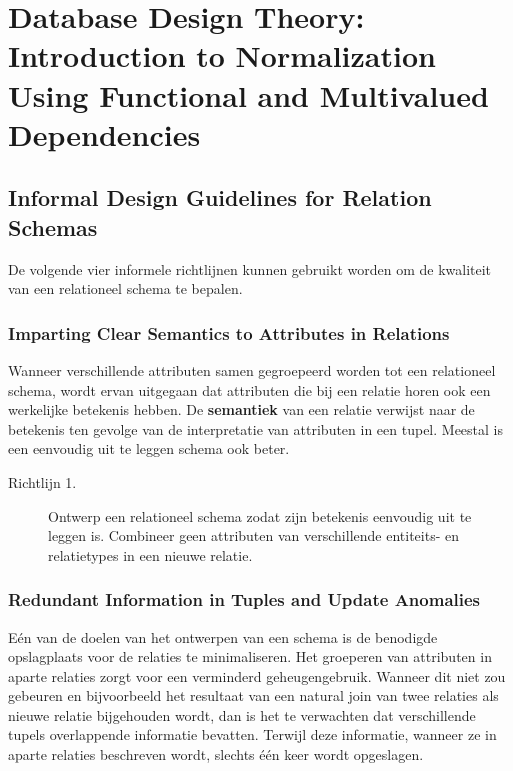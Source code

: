\chapter{Database Design Theory: Introduction to Normalization Using Functional and Multivalued Dependencies}
\section{Informal Design Guidelines for Relation Schemas}
De volgende vier informele richtlijnen kunnen gebruikt worden om de kwaliteit van een relationeel schema te bepalen.


\subsection{Imparting Clear Semantics to Attributes in Relations}
Wanneer verschillende attributen samen gegroepeerd worden tot een relationeel schema, wordt ervan uitgegaan dat attributen die bij een relatie horen ook een werkelijke betekenis hebben. De \textbf{semantiek} van een relatie verwijst naar de betekenis ten gevolge van de interpretatie van attributen in een tupel. Meestal is een eenvoudig uit te leggen schema ook beter. 

\begin{description}
	\item[Richtlijn 1.] Ontwerp een relationeel schema zodat zijn betekenis eenvoudig uit te leggen is. Combineer geen attributen van verschillende entiteits- en relatietypes in een nieuwe relatie.
\end{description}


\subsection{Redundant Information in Tuples and Update Anomalies}
E\'en van de doelen van het ontwerpen van een schema is de benodigde opslagplaats voor de relaties te minimaliseren. Het groeperen van attributen in aparte relaties zorgt voor een verminderd geheugengebruik. Wanneer dit niet zou gebeuren en bijvoorbeeld het resultaat van een natural join van twee relaties als nieuwe relatie bijgehouden wordt, dan is het te verwachten dat verschillende tupels overlappende informatie bevatten. Terwijl deze informatie, wanneer ze in aparte relaties beschreven wordt, slechts \'e\'en keer wordt opgeslagen.

